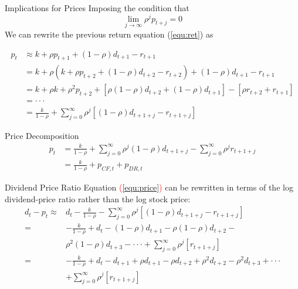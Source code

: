 \documentclass{beamer}
\begin{document}
\begin{frame}{Implications for Prices}
	Imposing the condition that $$\lim_{j\to\infty  }\rho ^{j}p_{t+j}=0$$
	We can rewrite the previous return equation (\ref{equ:ret}) as 

\begin{equation}\label{equ:price}
		\begin{aligned}
		p_t & \approx k+\rho p_{t+1}+(1-\rho )d_{t+1}-r_{t+1}	\\
		& = k+\rho ( k+\rho p_{t+2}+(1-\rho )d_{t+2}-r_{t+2}) +(1-\rho )d_{t+1}-r_{t+1}\\
		& = k + \rho k + \rho^2 p_{t+2} +[ \rho(1-\rho )d_{t+2} +(1-\rho )d_{t+1}] -[\rho r_{t+2} + r_{t+1}] \\
		& = \cdot \cdot \cdot \\
		& = \frac{k}{1-\rho }+\sum_{j=0}^{\infty }\rho ^{j}\left [ (1-\rho )d_{t+1+j}-r_{t+1+j} \right ] 
	\end{aligned}
\end{equation}
\end{frame}

\begin{frame}{Price Decomposition}
    \begin{equation}
        \begin{aligned}
        p_t & =\frac{k}{1-\rho}+\sum_{j=0}^{\infty} \rho^j(1-\rho) d_{t+1+j}-\sum_{j=0}^{\infty} \rho^j r_{t+1+j} \\
        & =\frac{k}{1-\rho}+p_{C F, t}+p_{D R, t}
        \end{aligned}
    \end{equation}
\end{frame}

\begin{frame}{Dividend Price Ratio}
	Equation \textcolor{red}{(\ref{equ:price})} can be rewritten in terms of the log dividend-price ratio
	rather than the log stock price:
	\begin{align*}
		d_t-p_t \approx &  d_t-\frac{k}{1-\rho }-\sum_{j=0}^{\infty }\rho ^{j}\left [ (1-\rho )d_{t+1+j}-r_{t+1+j} \right ] \\
		=& -\frac{k}{1-\rho } + d_t - (1-\rho)d_{t+1} - \rho (1-\rho)d_{t+2} -  \\
		& \rho^2 (1-\rho)d_{t+3}-\cdot \cdot \cdot + \sum_{j=0}^{\infty }\rho ^{j}\left [ r_{t+1+j} \right ]\\
		=& -\frac{k}{1-\rho }+d_t - d_{t+1} + \rho d_{t+1}-\rho d_{t+2} + \rho^2 d_{t+2}-\rho^2 d_{t+3} + \cdot \cdot \cdot \\
		& + \sum_{j=0}^{\infty }\rho ^{j}\left [ r_{t+1+j} \right ]\\
	\end{align*}
\end{frame}
\end{document}
